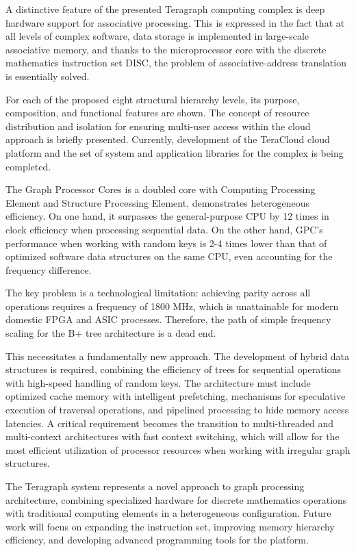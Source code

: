 
A distinctive feature of the presented Teragraph computing complex is deep hardware support for associative processing. This is expressed in the fact that at all levels of complex software, data storage is implemented in large-scale associative memory, and thanks to the microprocessor core with the discrete mathematics instruction set DISC, the problem of associative-address translation is essentially solved.

For each of the proposed eight structural hierarchy levels, its purpose, composition, and functional features are shown. The concept of resource distribution and isolation for ensuring multi-user access within the cloud approach is briefly presented. Currently, development of the TeraCloud cloud platform and the set of system and application libraries for the complex is being completed.

The Graph Processor Cores is a doubled core with Computing Processing Element and Structure Processing Element, demonstrates heterogeneous efficiency. On one hand, it surpasses the general-purpose CPU by 12 times in clock efficiency when processing sequential data. On the other hand, GPC's performance when working with random keys is 2-4 times lower than that of optimized software data structures on the same CPU, even accounting for the frequency difference.

The key problem is a technological limitation: achieving parity across all operations requires a frequency of 1800 MHz, which is unattainable for modern domestic FPGA and ASIC processes. Therefore, the path of simple frequency scaling for the B+ tree architecture is a dead end.

This necessitates a fundamentally new approach. The development of hybrid data structures is required, combining the efficiency of trees for sequential operations with high-speed handling of random keys. The architecture must include optimized cache memory with intelligent prefetching, mechanisms for speculative execution of traversal operations, and pipelined processing to hide memory access latencies. A critical requirement becomes the transition to multi-threaded and multi-context architectures with fast context switching, which will allow for the most efficient utilization of processor resources when working with irregular graph structures.

The Teragraph system represents a novel approach to graph processing architecture, combining specialized hardware for discrete mathematics operations with traditional computing elements in a heterogeneous configuration. Future work will focus on expanding the instruction set, improving memory hierarchy efficiency, and developing advanced programming tools for the platform.